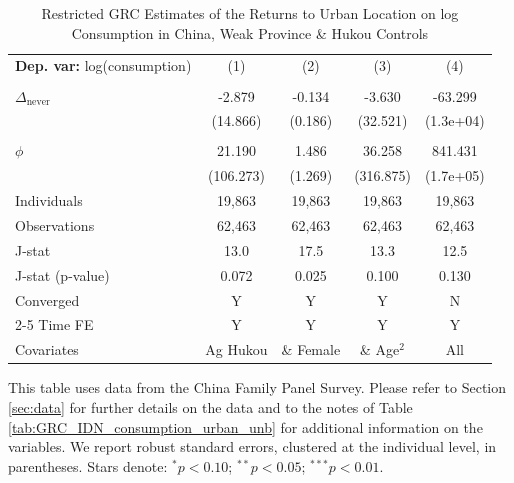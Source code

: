 \begin{table}[htbp] \centering \begin{threeparttable}
 \caption{Restricted GRC Estimates of the Returns to Urban Location on log Consumption in China, Weak Province & Hukou Controls} 
 \label{tab:GRC_CHN_w_hctrl_consumption_urban_unb} 
\begin{tabular}{l cccc} \toprule  \textbf{Dep. var:}  log(consumption) 
                    &\multicolumn{1}{c}{(1)}   &\multicolumn{1}{c}{(2)}   &\multicolumn{1}{c}{(3)}   &\multicolumn{1}{c}{(4)}   \\
                    &               &               &               &               \\
\addlinespace
$\Delta_{\text{never}}$&      -2.879   &      -0.134   &      -3.630   &     -63.299   \\
                    &    (14.866)   &     (0.186)   &    (32.521)   &   (1.3e+04)   \\
                    &               &               &               &               \\
\addlinespace
$\phi$              &      21.190   &       1.486   &      36.258   &     841.431   \\
                    &   (106.273)   &     (1.269)   &   (316.875)   &   (1.7e+05)   \\
\addlinespace
Individuals         &      19,863   &      19,863   &      19,863   &      19,863   \\
Observations        &      62,463   &      62,463   &      62,463   &      62,463   \\
J-stat              &        13.0   &        17.5   &        13.3   &        12.5   \\
J-stat (p-value)    &       0.072   &       0.025   &       0.100   &       0.130   \\
Converged           &           Y   &           Y   &           Y   &           N   \\
\cmidrule{2-5} Time FE & Y & Y & Y & Y \\ Covariates & Ag Hukou & \& Female & \& Age$^2$ & All \\ \bottomrule \end{tabular} \begin{tablenotes}[flushleft] \footnotesize \item{This table uses data from the China Family Panel Survey. Please refer to Section \ref{sec:data} for further details on the data and to the notes of Table \ref{tab:GRC_IDN_consumption_urban_unb} for additional information on the variables. We report robust standard errors, clustered at the individual level, in parentheses. Stars denote: $^{*} p<0.10$; $^{**} p<0.05$; $^{***} p<0.01$.} \end{tablenotes} \end{threeparttable} \end{table}
